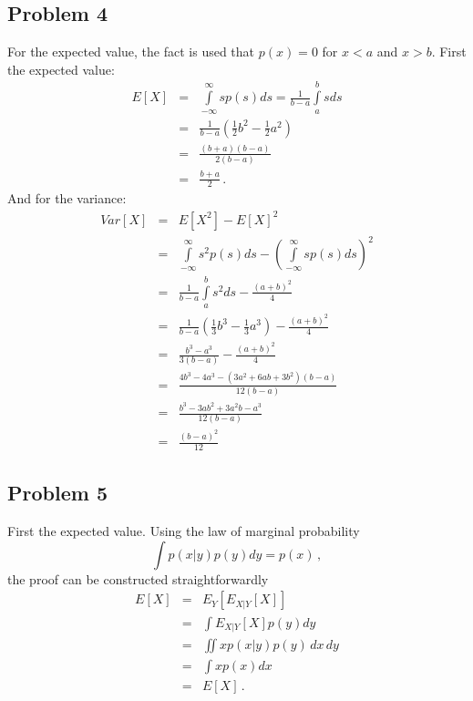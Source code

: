 \documentclass{scrartcl}
\begin{document}
\subsection{Problem 4} %
	\label{sec:problem_4}

For the expected value, the fact is used that $p(x) = 0$ for $x<a$ and $x>b$. First the expected value:
\begin{eqnarray}
E\left[X\right] &=& \int\limits_{-\infty}^\infty s p(s) ds = \frac{1}{b-a}\int\limits_{a}^b s ds\\
&=& \frac{1}{b-a} \left(\frac{1}{2}b^2 - \frac{1}{2}a^2\right)\\
&=& \frac{\left(b+a\right)\left(b-a\right)}{2\left(b-a\right)}\\
&=& \frac{b+a}{2} \, .
\end{eqnarray}
And for the variance:
\begin{eqnarray}
Var\left[X\right] &=& E\left[X^2\right] - E\left[X\right]^2\\
&=& \int\limits_{-\infty}^\infty s^2p(s)ds - \left(\int\limits_{-\infty}^\infty s p(s) ds\right)^2\\
&=& \frac{1}{b-a}\int\limits_a^b s^2ds - \frac{\left(a+b\right)^2}{4}\\
&=& \frac{1}{b-a}\left(\frac{1}{3}b^3 - \frac{1}{3}a^3\right) - \frac{\left(a+b\right)^2}{4}\\
&=& \frac{b^3 - a^3}{3\left(b-a\right)} - \frac{\left(a+b\right)^2}{4}\\
&=& \frac{4b^3 - 4a^3 - \left(3a^2 + 6ab + 3b^2\right)\left(b-a\right)}{12\left(b-a\right)}\\
&=& \frac{b^3 - 3ab^2 + 3a^2b - a^3}{12\left(b-a\right)}\\
&=& \frac{\left(b-a\right)^2}{12}
\end{eqnarray}
\subsection{Problem 5} %
	\label{sec:problem_5}

First the expected value. 
Using the law of marginal probability
\begin{equation}
	\int p(x|y)p(y)dy = p(x) \, ,
\end{equation}
the proof can be constructed straightforwardly
\begin{eqnarray}
	E\left[X\right] &=& E_Y\left[E_{X|Y}\left[X\right]\right]\\
	&=& \int E_{X|Y}\left[X\right]p(y)dy\\
	&=& \iint x p(x|y) p(y) \, dx\,  dy\\
	&=& \int x p(x) dx\\
	&=& E\left[X\right] \, .
\end{eqnarray}
\end{document}
